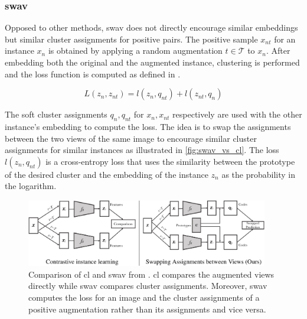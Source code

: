\subsubsection{\acl{swav}}\label{subsubsec:SwAV}

Opposed to other methods, \ac{swav} does not directly encourage similar embeddings but similar 
cluster assignments for positive pairs.
The positive sample $x_{nt}$ for an instance $x_n$ is obtained by applying a 
random augmentation $t \in \mathcal{T}$ to $x_n$.
After embedding both the original and the augmented instance, clustering is performed and 
the loss function is computed as defined in .

\begin{equation}
    L(z_n, z_{nt}) = l(z_n, q_{nt}) + l(z_{nt}, q_n)
    \label{eq:swav_loss}
\end{equation}

The soft cluster assignments $q_n, q_{nt}$ for $x_n, x_{nt}$ respectively 
are used with the other instance's embedding to compute the loss.
The idea is to swap the assignments between the two views of the same image to encourage 
similar cluster assignments for similar instances as illustrated in \autoref{fig:swav_vs_cl}.
The loss $l(z_n, q_{nt})$ is a cross-entropy loss that uses the similarity between the prototype 
of the desired cluster and the embedding of the instance $z_n$ as the probability in the logarithm.

\begin{figure}[!htb] %
    \centering
    \includegraphics[width=300pt]{images/SwAV_vs_CL.png}
    \caption{Comparison of \ac{cl} and \ac{swav} from \citet{swav_2020}.
    \ac{cl} compares the augmented views directly while 
    \ac{swav} compares cluster assignments.
    Moreover, \ac{swav} computes the loss for an image and the cluster assignments of a positive augmentation 
    rather than its assignments and vice versa.}
    \label{fig:swav_vs_cl}
\end{figure}

